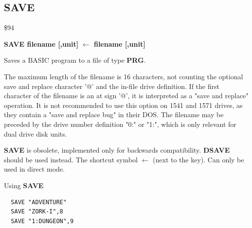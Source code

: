 \subsection{SAVE}
\begin{description}[leftmargin=2cm,style=nextline]
\item [Token:] \$94
\item [Format:] {\bf SAVE filename [,unit] }
                {\bf $\leftarrow$ filename [,unit] }
\item [Usage:]
   Saves a BASIC program to a file of type {\bf PRG}.

   \filenamedefinition

   The maximum length of the filename is 16 characters,
   not counting the optional save and replace character '@'
   and the in-file drive definition.
   If the first character of the filename is an at sign '@', it
   is interpreted as a "save and replace" operation. It is not recommended
   to use this option on 1541 and 1571 drives, as they
   contain a "save and replace bug" in their DOS.
   The filename may be preceded by the drive number definition
   "0:" or "1:", which is only relevant for dual drive disk units.

   \unitdefinition

\item [Remarks:] {\bf SAVE} is obsolete, implemented only for backwards compatibility.
                 {\bf DSAVE} should be used instead.
                 The shortcut symbol {\bf $\leftarrow$} (next to the  key). Can only be used in direct mode.

\item [Examples:] Using {\bf SAVE}
\begin{tcolorbox}[colback=black,coltext=white]
\verbatimfont{\codefont}
\begin{verbatim}
  SAVE "ADVENTURE"
  SAVE "ZORK-I",8
  SAVE "1:DUNGEON",9
\end{verbatim}
\end{tcolorbox}
\end{description}


\newpage
